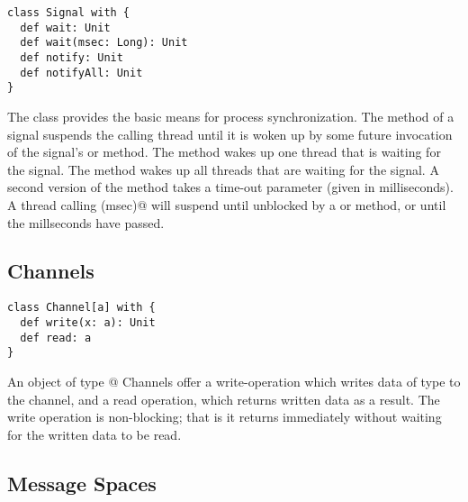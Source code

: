 \documentclass[11pt]{report}
\begin{document}
\begin{itemize}
\begin{verbatim}
class Signal with {
  def wait: Unit
  def wait(msec: Long): Unit
  def notify: Unit
  def notifyAll: Unit
}
\end{verbatim}

The \verb@Signal@ class provides the basic means for process
synchronization.  The \verb@wait@ method of a signal suspends the
calling thread until it is woken up by some future invocation of the
signal's \verb@notify@ or \verb@notifyAll@ method. The \verb@notify@
method wakes up one thread that is waiting for the signal. The
\verb@notifyAll@ method wakes up all threads that are waiting for the
signal. A second version of the \verb@wait@ method takes a time-out
parameter (given in milliseconds). A thread calling \verb@wait(msec)@
will suspend until unblocked by a \verb@notify@ or \verb@notifyAll@
method, or until the \verb@msec@ millseconds have passed.

\subsection{Channels}

\begin{verbatim}
class Channel[a] with {
  def write(x: a): Unit
  def read: a
}
\end{verbatim}

An object of type \verb@Channel[a]@ Channels offer a write-operation
which writes data of type \verb@a@ to the channel, and a read
operation, which returns written data as a result. The write operation
is non-blocking; that is it returns immediately without waiting for
the written data to be read.

\subsection{Message Spaces}


\end{itemize}
\end{document}
